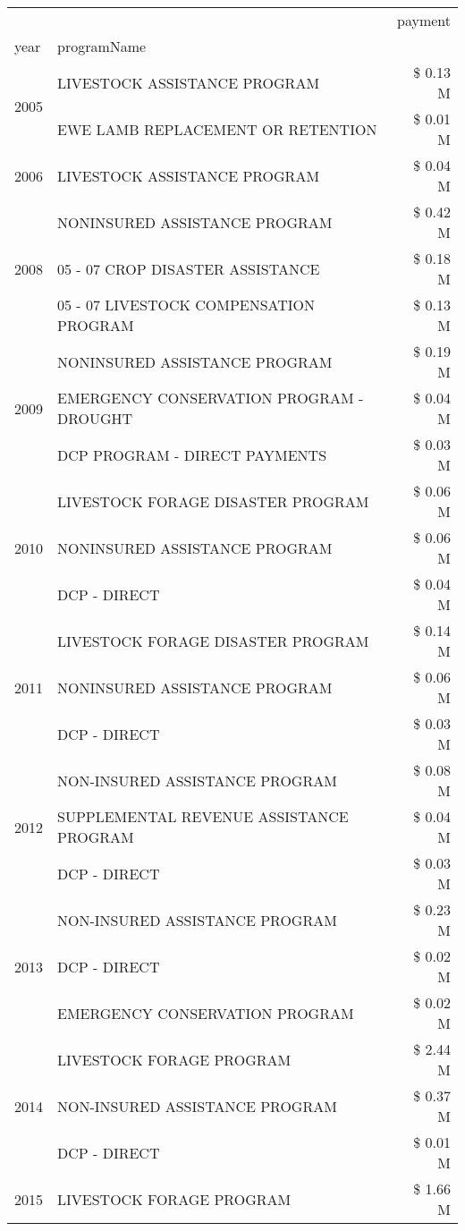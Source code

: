 \begin{tabular}{llr}
\toprule
 &  & payment \\
year & programName &  \\
\midrule
\multirow[t]{2}{*}{2005} & LIVESTOCK ASSISTANCE PROGRAM & \$ 0.13 M \\
 & EWE LAMB REPLACEMENT OR RETENTION & \$ 0.01 M \\
\cline{1-3}
2006 & LIVESTOCK ASSISTANCE PROGRAM & \$ 0.04 M \\
\cline{1-3}
\multirow[t]{3}{*}{2008} & NONINSURED ASSISTANCE PROGRAM & \$ 0.42 M \\
 & 05 - 07 CROP DISASTER ASSISTANCE & \$ 0.18 M \\
 & 05 - 07 LIVESTOCK COMPENSATION PROGRAM & \$ 0.13 M \\
\cline{1-3}
\multirow[t]{3}{*}{2009} & NONINSURED ASSISTANCE PROGRAM & \$ 0.19 M \\
 & EMERGENCY CONSERVATION PROGRAM - DROUGHT & \$ 0.04 M \\
 & DCP PROGRAM - DIRECT PAYMENTS & \$ 0.03 M \\
\cline{1-3}
\multirow[t]{3}{*}{2010} & LIVESTOCK FORAGE DISASTER PROGRAM & \$ 0.06 M \\
 & NONINSURED ASSISTANCE PROGRAM & \$ 0.06 M \\
 & DCP - DIRECT & \$ 0.04 M \\
\cline{1-3}
\multirow[t]{3}{*}{2011} & LIVESTOCK FORAGE DISASTER PROGRAM & \$ 0.14 M \\
 & NONINSURED ASSISTANCE PROGRAM & \$ 0.06 M \\
 & DCP - DIRECT & \$ 0.03 M \\
\cline{1-3}
\multirow[t]{3}{*}{2012} & NON-INSURED ASSISTANCE PROGRAM & \$ 0.08 M \\
 & SUPPLEMENTAL REVENUE ASSISTANCE PROGRAM & \$ 0.04 M \\
 & DCP - DIRECT & \$ 0.03 M \\
\cline{1-3}
\multirow[t]{3}{*}{2013} & NON-INSURED ASSISTANCE PROGRAM & \$ 0.23 M \\
 & DCP - DIRECT & \$ 0.02 M \\
 & EMERGENCY CONSERVATION PROGRAM & \$ 0.02 M \\
\cline{1-3}
\multirow[t]{3}{*}{2014} & LIVESTOCK FORAGE PROGRAM & \$ 2.44 M \\
 & NON-INSURED ASSISTANCE PROGRAM & \$ 0.37 M \\
 & DCP - DIRECT & \$ 0.01 M \\
\cline{1-3}
\multirow[t]{2}{*}{2015} & LIVESTOCK FORAGE PROGRAM & \$ 1.66 M \\

\end{tabular}
